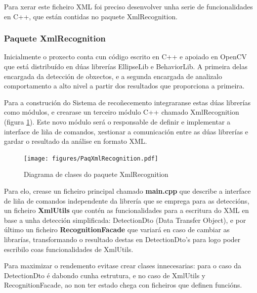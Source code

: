             Para xerar este ficheiro XML foi preciso desenvolver unha serie de funcionalidades en C++,
            que están contidas no paquete XmlRecognition.
        
        \subsubsection{Paquete XmlRecognition}
            Inicialmente o proxecto conta cun código escrito en C++ e apoiado en OpenCV que está distribuído en
            dúas librerías EllipseLib e BehaviorLib. A primeira delas encargada da detección de obxectos, e a segunda
            encargada de analizalo comportamento a alto nivel a partir dos resultados que proporciona a primeira.
            
            Para a construción do Sistema de recoñecemento integraranse estas dúas librerías como módulos, e 
            crearase un terceiro módulo C++ chamado XmlRecognition (figura \ref{fig:PaqXmlRecognition}).
            Este novo módulo será o responsable de definir e implementar a interface de liña de 
            comandos, xestionar a comunicación entre as dúas librerías e gardar o resultado da análise
            en formato XML.
            
            \begin{figure}[htp]
            \begin{center}
                \texttt{[image: figures/PaqXmlRecognition.pdf]}
                \caption{Diagrama de clases do paquete XmlRecognition}
            \label{fig:PaqXmlRecognition}
            \end{center}
            \end{figure}
            
            Para elo, crease un ficheiro principal chamado \textbf{main.cpp} que describe a interface de liña de comandos
            independente da librería que se emprega para as deteccións, un ficheiro \textbf{XmlUtils} que contén as
            funcionalidades para a escritura do XML en base a unha detección simplificada: DetectionDto 
            (Data Transfer Object), e por último un ficheiro \textbf{RecognitionFacade} que variará en 
            caso de cambiar as librarías, transformando o resultado destas en DetectionDto's para logo
            poder escribilo coas funcionalidades de XmlUtils.
            
            Para maximizar o rendemento evitase crear clases innecesarias: para o caso da DetectionDto é dabondo
            cunha estrutura, e no caso de XmlUtils y RecognitionFacade, ao non ter estado chega con ficheiros
            que definen funcións.
            

